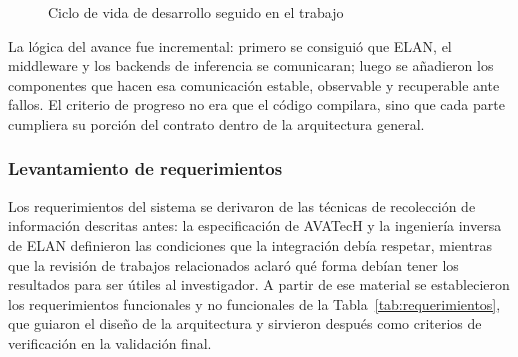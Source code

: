 \begin{figure}[H]
\centering
{}
\caption{Ciclo de vida de desarrollo seguido en el trabajo}
\label{fig:ciclo_desarrollo}
\end{figure}

La lógica del avance fue incremental: primero se consiguió que ELAN, el middleware y los backends de inferencia se comunicaran; luego se añadieron los componentes que hacen esa comunicación estable, observable y recuperable ante fallos. El criterio de progreso no era que el código compilara, sino que cada parte cumpliera su porción del contrato dentro de la arquitectura general.

\subsubsection{Levantamiento de requerimientos}

Los requerimientos del sistema se derivaron de las técnicas de recolección de información descritas antes: la especificación de AVATecH y la ingeniería inversa de ELAN definieron las condiciones que la integración debía respetar, mientras que la revisión de trabajos relacionados aclaró qué forma debían tener los resultados para ser útiles al investigador. A partir de ese material se establecieron los requerimientos funcionales y no funcionales de la Tabla~\ref{tab:requerimientos}, que guiaron el diseño de la arquitectura y sirvieron después como criterios de verificación en la validación final.


